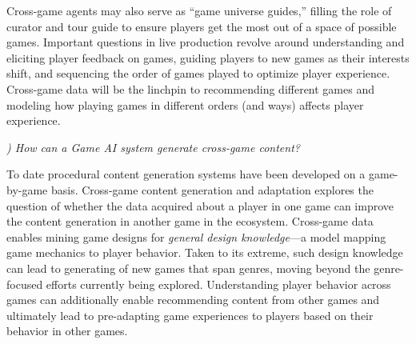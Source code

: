 \documentclass[conference]{IEEEtran}
\newcounter{questionno}
\newcommand{\mytodo}[1]{\textbf{[[#1]]}}
\newcommand{\subsubsectionx}[1]{{\em {\arabic{questionno}) #1}}
	\addtocounter{questionno}{1}
	}
\begin{document}
%
%


Cross-game agents may also serve as ``game universe guides,'' filling the role of curator and tour guide to ensure players get the most out of a space of possible games.
Important questions in live production revolve around understanding and eliciting player feedback on games, guiding players to new games as their interests shift, and sequencing the order of games played to optimize player experience.
Cross-game data will be the linchpin to recommending different games and modeling how playing games in different orders (and ways) affects player experience.

\subsubsectionx{How can a Game AI system generate cross-game content?}
%
To date procedural content generation systems have been developed on a game-by-game basis.
Cross-game content generation and adaptation explores the question of whether the data acquired about a player in one game can improve the content generation in another game in the ecosystem.
Cross-game data enables mining game designs for {\em general design knowledge}---a model mapping game mechanics to player behavior. 
Taken to its extreme, such design knowledge can lead to generating of new games that span genres, moving beyond the genre-focused efforts currently being explored.
Understanding player behavior across games can additionally enable recommending content from other games and ultimately lead to pre-adapting game experiences to players based on their behavior in other games. 
\end{document}
